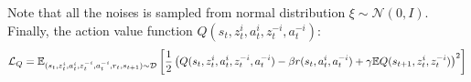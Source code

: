 Note that all the noises is sampled from normal distribution $\xi \sim \mathcal{N}(0, I)$. Finally, the action value function $Q(s_t, z^i_t, a^i_t, z^{-i}_t, a^{-i}_t)$:
\begin{equation}
    \mathcal{L}_{Q} = \mathbb{E}_{(s_t, z^i_t, a^i_t, z^{-i}_t, a^{-i}_t, r_t, s_{t+1}) \sim \mathcal{D}}\left[ \frac{1}{2}\left( Q(s_t, z^i_t, a^i_t, z^{-i}_t, a^{-i}_t) - \beta r(s_t, a_t^i, a^{-i}_t) + \gamma \mathbb{E}{Q(s_{t+1}, z^i_{t}, z^{-i}_{t})} \right)^2 \right]
\end{equation}
